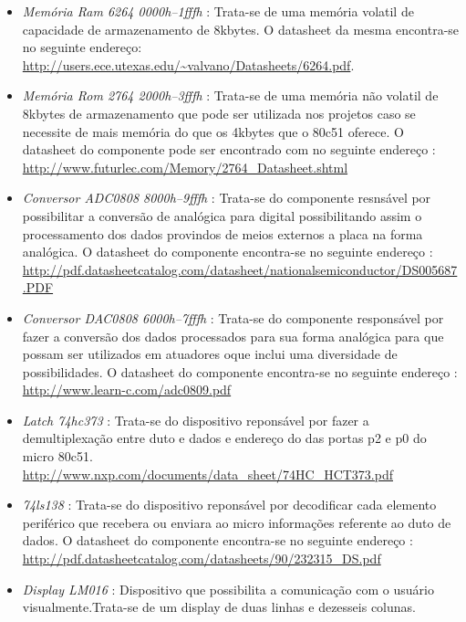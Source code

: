 \documentclass{Fabiano_file}
\begin{document}
 \begin{itemize}
 \item \textit{Memória Ram 6264 0000h--1fffh} : Trata-se de uma memória volatil de capacidade de armazenamento de 8kbytes. O datasheet da mesma encontra-se no seguinte endereço:
 \url{http://users.ece.utexas.edu/~valvano/Datasheets/6264.pdf}.
 
 \item \textit{Memória Rom 2764 2000h--3fffh} : Trata-se de uma memória não volatil de 8kbytes de armazenamento que pode ser utilizada nos projetos caso se necessite de mais memória
 do que os 4kbytes que o 80c51 oferece. O datasheet do componente pode ser encontrado com no seguinte endereço : \url{http://www.futurlec.com/Memory/2764_Datasheet.shtml}
 
 \item \textit{Conversor ADC0808 8000h--9fffh} : Trata-se do componente resnsável por possibilitar a conversão de analógica para digital possibilitando assim o processamento dos 
 dados provindos de meios externos a placa na forma analógica. O datasheet do componente encontra-se no seguinte endereço : \url{http://pdf.datasheetcatalog.com/datasheet/nationalsemiconductor/DS005687.PDF}
 
 \item \textit{Conversor DAC0808 6000h--7fffh} : Trata-se do componente responsável por fazer a conversão dos dados processados para sua forma analógica para que possam ser utilizados
 em atuadores oque inclui uma diversidade de possibilidades. O datasheet do componente encontra-se no seguinte endereço : \url{http://www.learn-c.com/adc0809.pdf}

 \item \textit{Latch 74hc373} : Trata-se do dispositivo reponsável por fazer a demultiplexação entre duto e dados e endereço do das portas p2 e p0 do micro 80c51.
 \url{http://www.nxp.com/documents/data_sheet/74HC_HCT373.pdf}
 
 \item \textit{74ls138} : Trata-se do dispositivo reponsável por decodificar cada elemento periférico que recebera ou enviara ao micro informações referente ao
 duto de dados. O datasheet do componente encontra-se no seguinte endereço : \url{http://pdf.datasheetcatalog.com/datasheets/90/232315_DS.pdf}
 
 \item \textit{Display LM016} : Dispositivo que possibilita a comunicação com o usuário visualmente.Trata-se de um display de duas linhas e dezesseis colunas.
 

\end{itemize}
\end{document}
